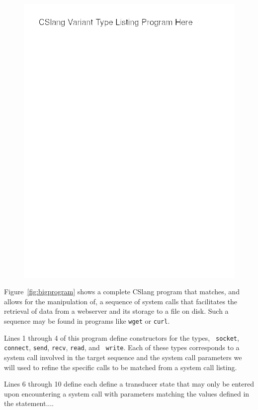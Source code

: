 \begin{figure}
  \includegraphics[scale=.30]{images/varianttypes}
  \caption{}
  \label{fig:varianttypes}
\end{figure}

Figure~\ref{fig:bigprogram} shows a complete CSlang program that matches,
and allows for the manipulation of, a sequence of system calls that
facilitates the retrieval of data from a webserver and its storage to a
file on disk.  Such a sequence may be found in programs like {\tt wget} or
{\tt curl}.

Lines 1 through 4 of this program define constructors for the types, {\tt
socket}, {\tt connect}, {\tt send}, {\tt recv}, {\tt read}, and {\tt
write}.  Each of these types corresponds to a system call involved in the
target sequence and the system call parameters we will used to refine the
specific calls to be matched from a system call listing.


Lines 6 through 10 define each define a transducer state that may only be
entered upon encountering a system call with parameters matching the values
defined in the statement....


